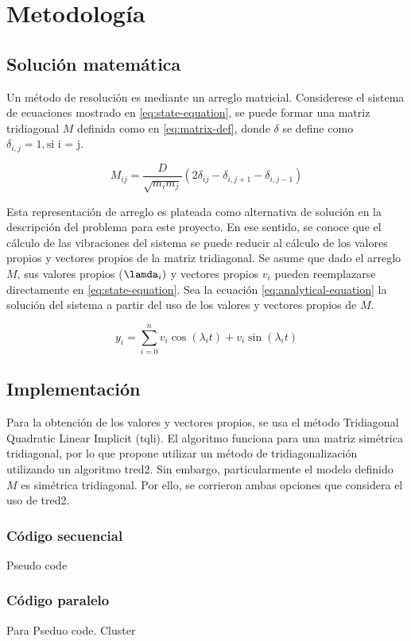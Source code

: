 \section{Metodología}
\subsection{Solución matemática}

Un método de resolución es mediante un arreglo matricial. Considerese el sistema de ecuaciones mostrado en \ref{eq:state-equation}, se puede formar una matriz tridiagonal $M$ definida como en \ref{eq:matrix-def}, donde $\delta$ se define como $\delta_{i,j} = 1, \text{si i = j}$.

\begin{equation}
    M_{ij} = \frac{D}{\sqrt{m_i m_j}} (2 \delta_{ij} - \delta_{i, j+1} - \delta_{i, j-1}) 
    \label{eq:matrix-def}
\end{equation}

Esta representación de arreglo es plateada como alternativa de solución en la descripción del problema para este proyecto. En ese sentido, se conoce que el cálculo de las vibraciones del sistema se puede reducir al cálculo de los valores propios y vectores propios de la matriz tridiagonal. Se asume que dado el arreglo $M$, sus valores propios ($\lamda_i)$ y vectores propios $v_i$ pueden reemplazarse directamente en \ref{eq:state-equation}. Sea la ecuación \ref{eq:analytical-equation} la solución del sistema a partir del uso de los valores y vectores propios de $M$.

\begin{equation}
    y_{i} = \sum^{n}_{i=0} v_i \cos(\lambda_i t ) + v_i \sin(\lambda_i t )  
    \label{eq:analyical-solution}
\end{equation}

\subsection{Implementación}
Para la obtención de los valores y vectores propios, se usa el método Tridiagonal Quadratic Linear Implicit (tqli). El algoritmo funciona para una matriz simétrica tridiagonal, por lo que propone utilizar un método de tridiagonalización utilizando un algoritmo tred2. Sin embargo, particularmente el modelo definido $M$ es simétrica tridiagonal. Por ello, se corrieron ambas opciones que considera el uso de tred2. 

\subsubsection{Código secuencial}
Pseudo code 

\subsubsection{Código paralelo}
Para
Pseduo code. Cluster